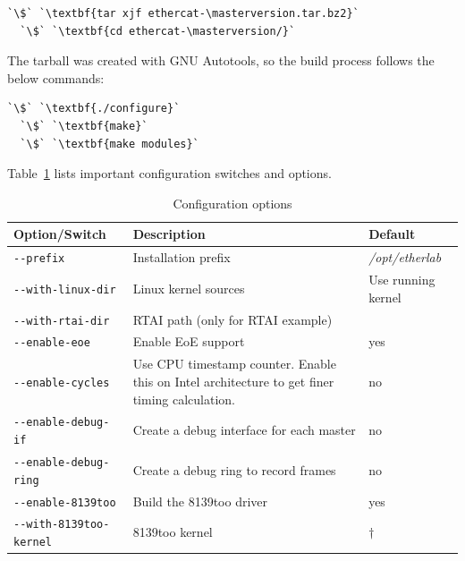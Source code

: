 \documentclass[a4paper,12pt,BCOR6mm,bibtotoc,idxtotoc]{scrbook}
\newcommand{\masterversion}{1.4.0}
\begin{document}
\begin{lstlisting}[gobble=2]
  `\$` `\textbf{tar xjf ethercat-\masterversion.tar.bz2}`
  `\$` `\textbf{cd ethercat-\masterversion/}`
\end{lstlisting}

The tarball was created with GNU Autotools, so the build process
follows the below commands:

\begin{lstlisting}[gobble=2]
  `\$` `\textbf{./configure}`
  `\$` `\textbf{make}`
  `\$` `\textbf{make modules}`
\end{lstlisting}

Table~\ref{tab:config} lists important configuration switches and options.

\begin{table}
  \caption{Configuration options}
  \label{tab:config}
  \vspace{2mm}
  \begin{tabular}{l|p{}|l}

\bf Option/Switch & \bf Description & \bf Default\\\hline

\lstinline+--prefix+ & Installation prefix & \textit{/opt/etherlab}\\

\lstinline+--with-linux-dir+ & Linux kernel sources & Use running kernel\\

\lstinline+--with-rtai-dir+ & RTAI path (only for RTAI example) & \\

\hline

\lstinline+--enable-eoe+ & Enable EoE support & yes\\

\lstinline+--enable-cycles+ & Use CPU timestamp counter. Enable this on Intel
architecture to get finer timing calculation. & no\\

\lstinline+--enable-debug-if+ & Create a debug interface for each master & no\\

\lstinline+--enable-debug-ring+ & Create a debug ring to record frames & no\\

\hline

\lstinline+--enable-8139too+ & Build the 8139too driver & yes\\

\lstinline+--with-8139too-kernel+ & 8139too kernel & $\dagger$\\


\end{tabular}
\end{table}
\end{document}
